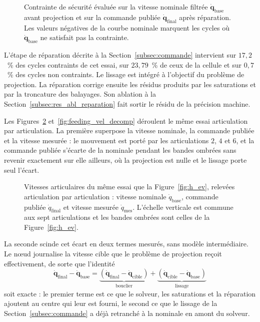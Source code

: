 \begin{figure}[!htbp]
    \centering
    
    \caption[Évolution du résidu de contrainte avant et après correction]{Contrainte de sécurité évaluée sur la vitesse nominale filtrée $\dot{\mathbf{q}}_{\mathrm{base}}$ avant projection et sur la commande publiée $\dot{\mathbf{q}}_{\mathrm{final}}$ après réparation. Les valeurs négatives de la courbe nominale marquent les cycles où $\dot{\mathbf{q}}_{\mathrm{base}}$ ne satisfait pas la contrainte.}\label{fig:constraint_ev}
\end{figure}

L'étape de réparation décrite à la Section~\ref{subsec:commande} intervient sur $17{,}2$~\% des cycles contraints de cet essai, sur $23{,}79$~\% de ceux de la cellule et sur $0{,}7$~\% des cycles non contraints. Le lissage est intégré à l'objectif du problème de projection. La réparation corrige ensuite les résidus produits par les saturations et par la troncature des balayages. Son ablation à la Section~\ref{subsec:res_abl_reparation} fait sortir le résidu de la précision machine.

Les Figures~\ref{fig:feeding_vel_joints} et~\ref{fig:feeding_vel_decomp} déroulent le même essai articulation par articulation. La première superpose la vitesse nominale, la commande publiée et la vitesse mesurée : le mouvement est porté par les articulations $2$, $4$ et $6$, et la commande publiée s'écarte de la nominale pendant les bandes ombrées sans revenir exactement sur elle ailleurs, où la projection est nulle et le lissage porte seul l'écart.

\begin{figure}[!htbp]
    \centering
    
    \caption[Profils de vitesses articulaires (tâche d'alimentation)]{Vitesses articulaires du même essai que la Figure~\ref{fig:h_ev}, relevées articulation par articulation : vitesse nominale $\dot{q}_{\mathrm{base}}$, commande publiée $\dot{q}_{\mathrm{final}}$ et vitesse mesurée $\dot{q}_{\mathrm{mes}}$. L'échelle verticale est commune aux sept articulations et les bandes ombrées sont celles de la Figure~\ref{fig:h_ev}.}\label{fig:feeding_vel_joints}
\end{figure}

La seconde scinde cet écart en deux termes mesurés, sans modèle intermédiaire. Le n\oe ud journalise la vitesse cible que le problème de projection reçoit effectivement, de sorte que l'identité
\begin{equation}
\dot{\mathbf{q}}_{\mathrm{final}} - \dot{\mathbf{q}}_{\mathrm{base}}
= \underbrace{(\dot{\mathbf{q}}_{\mathrm{final}} - \dot{\mathbf{q}}_{\mathrm{cible}})}_{\text{bouclier}}
+ \underbrace{(\dot{\mathbf{q}}_{\mathrm{cible}} - \dot{\mathbf{q}}_{\mathrm{base}})}_{\text{lissage}}
\label{eq:decomp_vitesse}
\end{equation}
soit exacte : le premier terme est ce que le solveur, les saturations et la réparation ajoutent au centre qui leur est fourni, le second ce que le lissage de la Section~\ref{subsec:commande} a déjà retranché à la nominale en amont du solveur.

